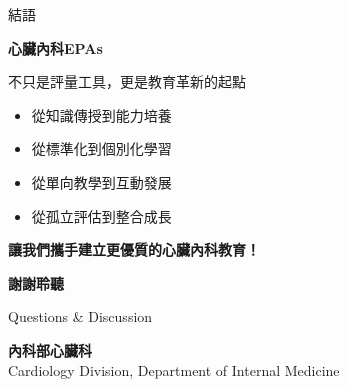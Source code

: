 \documentclass[aspectratio=169]{beamer}
\begin{document}
\begin{frame}{結語}
\begin{center}
\Large{\textcolor{emergency_red}{\textbf{心臟內科EPAs}}}
\end{center}

\vspace{0.5cm}

\begin{center}
\large{不只是評量工具，更是教育革新的起點}
\end{center}

\vspace{1cm}

\begin{itemize}
\item 從知識傳授到能力培養
\item 從標準化到個別化學習
\item 從單向教學到互動發展
\item 從孤立評估到整合成長
\end{itemize}

\vspace{1cm}

\begin{center}
\textbf{\textcolor{emergency_blue}{讓我們攜手建立更優質的心臟內科教育！}}
\end{center}
\end{frame}

\begin{frame}[plain]
\begin{center}
\Huge{\textcolor{emergency_blue}{\textbf{謝謝聆聽}}}

\vspace{1cm}

\Large{\textcolor{emergency_gray}{Questions \& Discussion}}

\vspace{1cm}

\textcolor{emergency_red}{\textbf{內科部心臟科}}\\
\textcolor{emergency_blue}{Cardiology Division, Department of Internal Medicine}
\end{center}
\end{frame}
\end{document}
